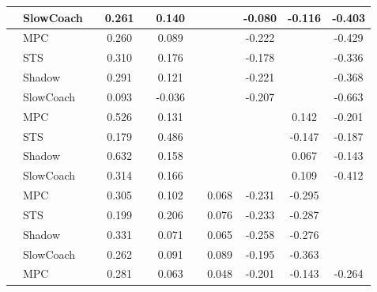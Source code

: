 \begin{tabular}{|l|l|*{9}{c|}}
                                                           & SlowCoach &       &     0.261 &        &  0.140 &     &     &  -0.080 &  -0.116 &   -0.403 \\
\midrule
[False, True, False, True, False, False, True, False, True] & MPC &       &     0.260 &        &  0.089 &     &     &  -0.222 &      &   -0.429 \\
                                                           & STS &       &     0.310 &        &  0.176 &     &     &  -0.178 &      &   -0.336 \\
                                                           & Shadow &       &     0.291 &        &  0.121 &     &     &  -0.221 &      &   -0.368 \\
                                                           & SlowCoach &       &     0.093 &        & -0.036 &     &     &  -0.207 &      &   -0.663 \\
\midrule
[False, True, False, True, False, False, False, True, True] & MPC &       &     0.526 &        &  0.131 &     &     &      &   0.142 &   -0.201 \\
                                                           & STS &       &     0.179 &        &  0.486 &     &     &      &  -0.147 &   -0.187 \\
                                                           & Shadow &       &     0.632 &        &  0.158 &     &     &      &   0.067 &   -0.143 \\
                                                           & SlowCoach &       &     0.314 &        &  0.166 &     &     &      &   0.109 &   -0.412 \\
\midrule
[False, True, False, True, False, True, True, True, False] & MPC &       &     0.305 &        &  0.102 &     &  0.068 &  -0.231 &  -0.295 &       \\
                                                           & STS &       &     0.199 &        &  0.206 &     &  0.076 &  -0.233 &  -0.287 &       \\
                                                           & Shadow &       &     0.331 &        &  0.071 &     &  0.065 &  -0.258 &  -0.276 &       \\
                                                           & SlowCoach &       &     0.262 &        &  0.091 &     &  0.089 &  -0.195 &  -0.363 &       \\
\midrule
[False, True, False, True, False, True, True, True, True] & MPC &       &     0.281 &        &  0.063 &     &  0.048 &  -0.201 &  -0.143 &   -0.264 \\

\end{tabular}
